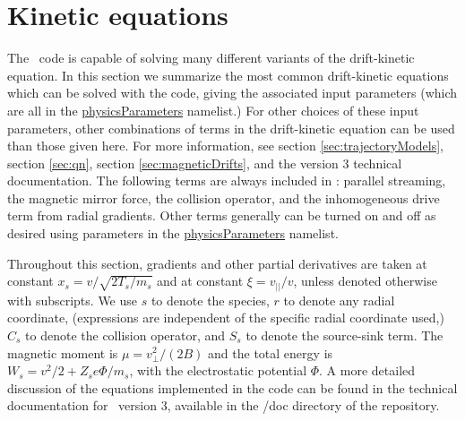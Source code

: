 \chapter{Kinetic equations}

The \sfincs~code is capable of solving many different variants of the drift-kinetic equation.
In this section we summarize the most common drift-kinetic equations
which can be solved with the code, giving the associated input parameters
(which are all in the  {\ttfamily \hyperref[sec:physicsParameters]{physicsParameters}} namelist.)
For other choices of these input parameters, 
other combinations of terms in the drift-kinetic equation can be used than those
given here.
For more information, see section \ref{sec:trajectoryModels}, section \ref{sec:qn}, section \ref{sec:magneticDrifts},
and the version 3 technical documentation.
The following terms are always included in \sfincs:
parallel streaming, the magnetic mirror force, the collision operator,
and the inhomogeneous drive term from radial gradients.
Other terms generally can be turned on and off as desired using parameters in the
{\ttfamily \hyperref[sec:physicsParameters]{physicsParameters}} namelist.

Throughout this section, gradients and other partial derivatives are taken
at constant $x_s = v/\sqrt{2T_s/m_s}$ and at constant $\xi = v_{||} / v$, unless denoted otherwise with subscripts. 
We use $s$ to denote the species, $r$ to denote any radial coordinate, (expressions are independent
of the specific radial coordinate used,)
$C_s$ to denote the collision operator, and $S_s$ to denote the source-sink term. 
The magnetic moment is $\mu = v_{\perp}^2/\left(2 B\right)$ and the total energy is $W_s = v^2 / 2 + Z_s e \Phi / m_s$, 
with the electrostatic potential $\Phi$. 
A more detailed discussion of the equations implemented in the code can be found
in the technical documentation for \sfincs~version 3, available in the {\ttfamily /doc} directory
of the repository.

